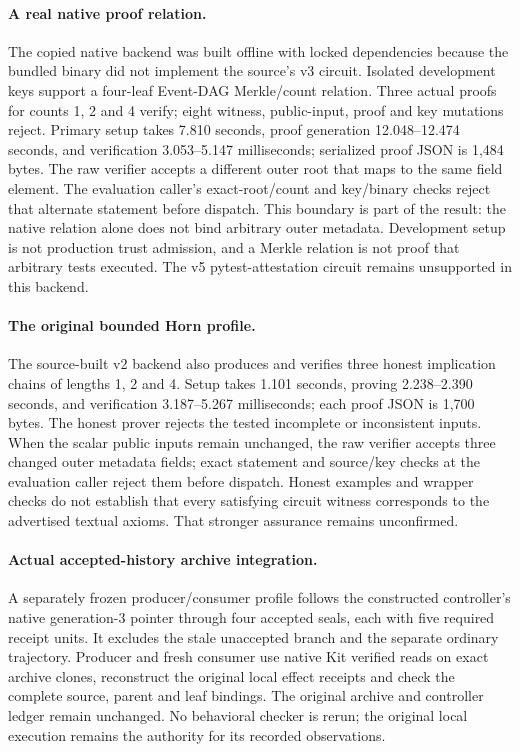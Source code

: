 \paragraph{A real native proof relation.}
The copied native backend was built offline with locked dependencies because
the bundled binary did not implement the source's v3 circuit. Isolated
development keys support a four-leaf Event-DAG Merkle/count relation. Three
actual proofs for counts 1, 2 and 4 verify; eight witness, public-input,
proof and key mutations reject. Primary setup takes 7.810 seconds,
proof generation 12.048--12.474 seconds, and verification
3.053--5.147 milliseconds; serialized proof JSON is 1,484 bytes.
The raw verifier accepts a different outer root that maps to the same field
element. The evaluation caller's exact-root/count and key/binary checks reject
that alternate statement before dispatch. This boundary is part of the result:
the native relation alone does not bind arbitrary outer metadata. Development
setup is not production trust admission, and a Merkle relation is not proof
that arbitrary tests executed. The v5 pytest-attestation circuit remains
unsupported in this backend.

\paragraph{The original bounded Horn profile.}
The source-built v2 backend also produces and verifies three honest implication
chains of lengths 1, 2 and 4. Setup takes 1.101 seconds, proving
2.238--2.390 seconds, and verification
3.187--5.267 milliseconds; each proof JSON is 1,700 bytes.
The honest prover rejects the tested incomplete or inconsistent inputs.
When the scalar public inputs remain unchanged, the raw verifier accepts three
changed outer metadata fields; exact statement and source/key checks at the
evaluation caller reject them before dispatch. Honest examples and wrapper
checks do not establish that every satisfying circuit witness corresponds to
the advertised textual axioms. That stronger assurance remains unconfirmed.


\paragraph{Actual accepted-history archive integration.}
A separately frozen producer/consumer profile follows the constructed
controller's native generation-3 pointer through four accepted seals, each
with five required receipt units. It excludes the stale unaccepted branch and
the separate ordinary trajectory. Producer and fresh consumer use native Kit
verified reads on exact archive clones, reconstruct the original local effect
receipts and check the complete source, parent and leaf bindings. The original
archive and controller ledger remain unchanged. No behavioral checker is rerun;
the original local execution remains the authority for its recorded observations.

